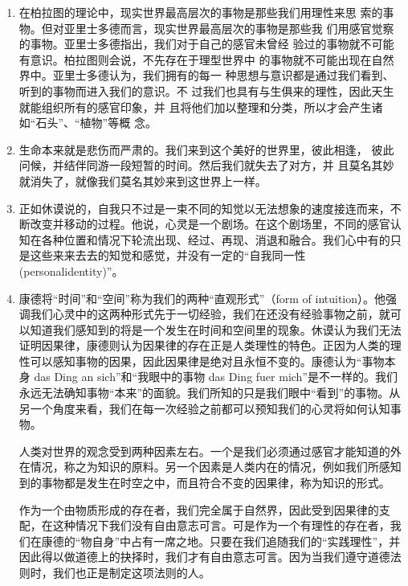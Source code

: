 \documentclass[UTF8]{ctexart}
\begin{document}
		\begin{enumerate}
		
			\item 在柏拉图的理论中，现实世界最高层次的事物是那些我们用理性来思
			索的事物。但对亚里士多德而言，现实世界最高层次的事物是那些我
			们用感官觉察的事物。亚里士多德指出，我们对于自己的感官未曾经
			验过的事物就不可能有意识。柏拉图则会说，不先存在于理型世界中
			的事物就不可能出现在自然界中。亚里士多德认为，我们拥有的每一
			种思想与意识都是通过我们看到、听到的事物而进入我们的意识。不
			过我们也具有与生俱来的理性，因此天生就能组织所有的感官印象，并
			且将他们加以整理和分类，所以才会产生诸如“石头”、“植物”等概
			念。
		
			\item 生命本来就是悲伤而严肃的。我们来到这个美好的世界里，彼此相逢，
			彼此问候，并结伴同游一段短暂的时间。然后我们就失去了对方，并
			且莫名其妙就消失了，就像我们莫名其妙来到这世界上一样。
		
			\item 正如休谟说的，自我只不过是一束不同的知觉以无法想象的速度接连而来，不断改变并移动的过程。他说，心灵是一个剧场。在这个剧场里，不同的感官认知在各种位置和情况下轮流出现、经过、再现、消退和融合。我们心中有的只是这些来来去去的知觉和感觉，并没有一定的“自我同一性(personalidentity)”。
			
			\item 康德将“时间”和“空间”称为我们的两种“直观形式”（form of intuition）。他强调我们心灵中的这两种形式先于一切经验，我们在还没有经验事物之前，就可以知道我们感知到的将是一个发生在时间和空间里的现象。休谟认为我们无法证明因果律，康德则认为因果律的存在正是人类理性的特色。正因为人类的理性可以感知事物的因果，因此因果律是绝对且永恒不变的。康德认为“事物本身 das Ding an sich”和“我眼中的事物 das Ding fuer mich”是不一样的。我们永远无法确知事物“本来”的面貌。我们所知的只是我们眼中“看到”的事物。从另一个角度来看，我们在每一次经验之前都可以预知我们的心灵将如何认知事物。
			
			人类对世界的观念受到两种因素左右。一个是我们必须通过感官才能知道的外在情况，称之为知识的原料。另一个因素是人类内在的情况，例如我们所感知到的事物都是发生在时空之中，而且符合不变的因果律，称为知识的形式。
			
			作为一个由物质形成的存在者，我们完全属于自然界，因此受到因果律的支配，在这种情况下我们没有自由意志可言。可是作为一个有理性的存在者，我们在康德的“物自身”中占有一席之地。只要在我们追随我们的“实践理性”，并因此得以做道德上的抉择时，我们才有自由意志可言。因为当我们遵守道德法则时，我们也正是制定这项法则的人。
			

\end{enumerate}
\end{document}

